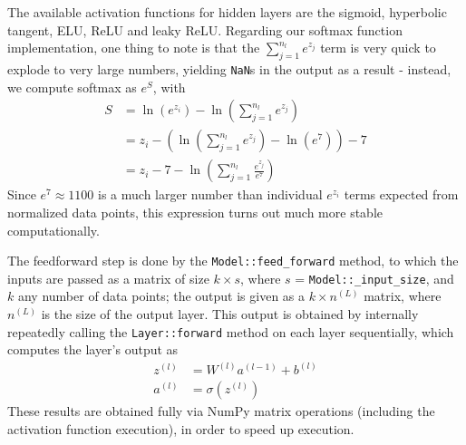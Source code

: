 \documentclass[aps,reprint,superscriptaddress,nofootinbib]{revtex4-2}
\begin{document}
The available activation functions for hidden layers are the sigmoid, hyperbolic tangent, ELU, ReLU and leaky ReLU. Regarding our softmax function implementation, one thing to note is that the \(\sum_{j = 1}^{n_l} e^{z_j}\) term is very quick to explode to very large numbers, yielding \texttt{NaN}s in the output as a result - instead, we compute softmax as \(e^S\), with
\begin{align*}
    S &= \ln\left(e^{z_i}\right) - \ln\left(\sum_{j = 1}^{n_l}e^{z_j}\right)
    \\
    &= z_i - \left(\ln\left(\sum_{j = 1}^{n_l}e^{z_j}\right) - \ln\left(e^7\right)\right) - 7
    \\
    &= z_i - 7 - \ln\left(\sum_{j = 1}^{n_l}\frac{e^{z_j}}{e^7}\right)
\end{align*}
Since \(e^7 \approx 1100\) is a much larger number than individual \(e^{z_i}\) terms expected from normalized data points, this expression turns out much more stable computationally.

The feedforward step is done by the \texttt{Model::\linebreak[0]feed\_\linebreak[0]forward} method, to which the inputs are passed as a matrix of size $k\times s$, where $s$ = \texttt{Model::\linebreak[0]\_input\_\linebreak[0]size}, and $k$ any number of data points; the output is given as a $k\times n^{(L)}$ matrix, where $n^{(L)}$ is the size of the output layer. This output is obtained by internally repeatedly calling the \texttt{Layer::\linebreak[0]forward} method on each layer sequentially, which computes the layer's output as
\begin{align*}
    z^{(l)} &= W^{(l)} a^{(l-1)} + b^{(l)}
    \\
    a^{(l)} &= \sigma ( z^{(l)} )
\end{align*}
These results are obtained fully via NumPy matrix operations (including the activation function execution), in order to speed up execution.
\end{document}
